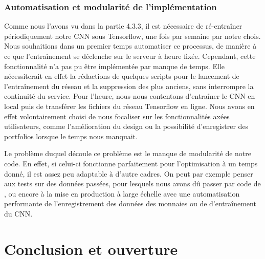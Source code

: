 \documentclass[a4paper, 10pt]{article}
\begin{document}
\subsubsection{Automatisation et modularité de l'implémentation}

Comme nous l'avons vu dans la partie 4.3.3, il est nécessaire de ré-entraîner périodiquement notre CNN sous Tensorflow, une fois par semaine par notre chois. Nous souhaitions dans un premier temps automatiser ce processus, de manière à ce que l'entraînement se déclenche sur le serveur à heure fixée. Cependant, cette fonctionnalité n'a pas pu être implémentée par manque de temps. Elle nécessiterait en effet la rédactions de quelques scripts pour le lancement de l'entraînement du réseau et la suppression des plus anciens, sans interrompre la continuité du service. Pour l'heure, nous nous contentons d'entraîner le CNN en local puis de transférer les fichiers du réseau Tensorflow en ligne. Nous avons en effet volontairement choisi de nous focaliser sur les fonctionnalités axées utilisateurs, comme l'amélioration du design ou la possibilité d'enregistrer des portfolios lorsque le temps nous manquait.

Le problème duquel découle ce problème est le manque de modularité de notre code. En effet, si celui-ci fonctionne parfaitement pour l'optimisation à un temps donné, il est assez peu adaptable à d'autre cadres. On peut par exemple penser aux tests sur des données passées, pour lesquels nous avons dû passer par code de \cite{Jiang2017}, ou encore à la mise en production à large échelle avec une automatisation performante de l'enregistrement des données des monnaies ou de d'entraînement du CNN.

\newpage
\section*{Conclusion et ouverture}
\label{sec:conclu}
\end{document}
